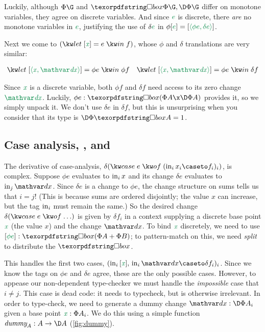 \noindent
Luckily, although $\Phi\G$ and $\iso\Phi\G,\DP\G$ differ on monotone variables,
they agree on discrete variables. And since $\isocolor e$ is discrete, there
\emph{are} no monotone variables in $\isocolor e$, justifying the use of
$\delta\isocolor e$ in $\phi\ebox{e} = \ebox{\etuple{\phi e, \delta e}}$.

Next we come to $(\eletbox x e f)$, whose $\phi$ and $\delta$ translations are
very similar:

\begin{align*}
  \elet{\ebox{\etuple{\dvar x,\dvar\dx}} = \phi e} \phi f
  &&
  \elet{\ebox{\etuple{\dvar x,\dvar\dx}} = \phi e} \delta f
\end{align*}

\noindent
Since $\dvar x$ is a discrete variable, both $\phi f$ and $\delta f$ need access
to its zero change $\dvar\dx$. Luckily, $\phi e : \iso(\Phi A \x \DP A)$
provides it, so we simply unpack it. We don't use $\delta e$ in $\delta f$, but
this is unsurprising when you consider that its type is $\DP\iso A = \tunit$.


\subsection{Case analysis, , and }

\newcommand\evalsto\mapsto

The derivative of case-analysis, $\delta(\ecase{e}{(\inj i x_i \caseto
  f_i)_i})$, is complex.
%
Suppose $\phi e$ evaluates to $\mathrm{in}_{i}\, x$ and its change $\delta e$ evaluates to
$\inj j \dx$.
%
Since $\delta e$ is a change to $\phi e$, the change structure on sums tells us
that $i = j$! (This is because sums are ordered disjointly; the value $x$ can
increase, but the tag $\mathrm{in}_i$ must remain the same.)
%
So the desired change $\delta(\ecase{e}{\dots})$ is given by $\delta f_i$ in a
context supplying a discrete base point $\dvar x$ (the value $x$) and the change
$\dx$.
%
To bind $\dvar x$ discretely, we need to use $\ebox{\phi e} : \iso(\Phi A + \Phi
B)$; to pattern-match on this, we need \emph{split} to distribute the $\iso$.

This handles the first two cases, $(\inj i {\eboxvar x},\, \inj i \dx \caseto
\delta f_i)_i$. Since we know the tags on $\phi e$ and $\delta e$ agree, these
are the only possible cases. However, to appease our non-dependent type-checker
we must handle the \emph{impossible} case that $i \ne j$. This case is dead
code: it needs to typecheck, but is otherwise irrelevant. In order to
type-check, we need to generate a dummy change $\dx : \DP A_i$ given a base
point $\dvar x : \Phi A_i$. We do this using a simple function $\dummy_A : A \to
\D A$ (\cref{fig:dummy}).

